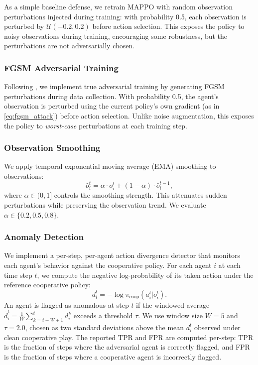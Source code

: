 \documentclass[12pt,a4paper]{article}
\begin{document}
As a simple baseline defense, we retrain MAPPO with random observation perturbations injected during training: with probability 0.5, each observation is perturbed by $\mathcal{U}(-0.2, 0.2)$ before action selection. This exposes the policy to noisy observations during training, encouraging some robustness, but the perturbations are not adversarially chosen.

\subsubsection{FGSM Adversarial Training}

Following \citet{madry2018towards}, we implement true adversarial training by generating FGSM perturbations during data collection. With probability 0.5, the agent's observation is perturbed using the current policy's own gradient (as in \cref{eq:fgsm_attack}) before action selection. Unlike noise augmentation, this exposes the policy to \emph{worst-case} perturbations at each training step.

\subsubsection{Observation Smoothing}

We apply temporal exponential moving average (EMA) smoothing to observations:
\begin{equation}
    \hat{o}_i^t = \alpha \cdot o_i^t + (1 - \alpha) \cdot \hat{o}_i^{t-1},
\end{equation}
where $\alpha \in (0, 1]$ controls the smoothing strength. This attenuates sudden perturbations while preserving the observation trend. We evaluate $\alpha \in \{0.2, 0.5, 0.8\}$.

\subsubsection{Anomaly Detection}

We implement a per-step, per-agent action divergence detector that monitors each agent's behavior against the cooperative policy. For each agent $i$ at each time step $t$, we compute the negative log-probability of its taken action under the reference cooperative policy:
\begin{equation}
    d_i^t = -\log \pi_\text{coop}(a_i^t | o_i^t).
\end{equation}
An agent is flagged as anomalous at step $t$ if the windowed average $\bar{d}_i^t = \frac{1}{W}\sum_{k=t-W+1}^{t} d_i^k$ exceeds a threshold $\tau$. We use window size $W=5$ and $\tau = 2.0$, chosen as two standard deviations above the mean $d_i^t$ observed under clean cooperative play. The reported TPR and FPR are computed per-step: TPR is the fraction of steps where the adversarial agent is correctly flagged, and FPR is the fraction of steps where a cooperative agent is incorrectly flagged.
\end{document}

